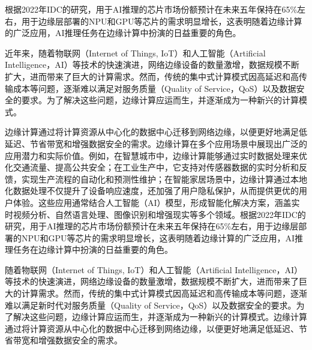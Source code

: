根据2022年IDC的研究\cite{china-ai-computing-power-2022}，用于AI推理的芯片市场份额预计在未来五年保持在65\%左右，用于边缘层部署的NPU和GPU等芯片的需求明显增长，这表明随着边缘计算的广泛应用，AI推理任务在边缘计算中扮演的日益重要的角色。

近年来，随着物联网（Internet of Things, IoT）和人工智能（Artificial Intelligence，AI）等技术的快速演进，网络边缘设备的数量激增，数据规模不断扩大，进而带来了巨大的计算需求。然而，传统的集中式计算模式因高延迟和高传输成本等问题，逐渐难以满足对服务质量（Quality of Service，QoS）以及数据安全的要求。为了解决这些问题，边缘计算应运而生，并逐渐成为一种新兴的计算模式。

边缘计算通过将计算资源从中心化的数据中心迁移到网络边缘，以便更好地满足低延迟、节省带宽和增强数据安全的需求\cite{chowdhury2019co,khan2019edge,liu2019survey,施巍松2019边缘计算,刘通2021边缘计算中任务卸载研究综述}。边缘计算在多个应用场景中展现出广泛的应用潜力和实际价值。例如，在智慧城市中，边缘计算能够通过实时数据处理来优化交通流量、提高公共安全\cite{lin2016real,jia2017edge,mohamed2017smartcityware,mallapuram2017smart,dalla2017using}；在工业生产中，它支持对传感器数据的实时分析和反馈，实现生产流程的自动化和预测性维护\cite{yin2015big,yan2017industrial,zhang2017self,peres2018idarts,mohamed2019leveraging}；在智能家居场景中，边缘计算通过本地化数据处理不仅提升了设备响应速度，还加强了用户隐私保护，从而提供更优的用户体验\cite{savio2018smart,krejcar2020technology,黄倩怡2020智能家居中的边缘计算}。这些应用通常结合人工智能（AI）模型，形成智能化解决方案，涵盖实时视频分析、自然语言处理、图像识别和增强现实等多个领域\cite{deng2020edge,gill2025edge}。根据2022年IDC的研究\cite{china-ai-computing-power-2022}，用于AI推理的芯片市场份额预计在未来五年保持在65\%左右，用于边缘层部署的NPU和GPU等芯片的需求明显增长，这表明随着边缘计算的广泛应用，AI推理任务在边缘计算中扮演的日益重要的角色。





随着物联网（Internet of Things, IoT）和人工智能（Artificial Intelligence，AI）等技术的快速演进，网络边缘设备的数量激增，数据规模不断扩大，进而带来了巨大的计算需求\cite{zwolenski2014digital}。然而，传统的集中式计算模式因高延迟和高传输成本等问题，逐渐难以满足新时代对服务质量（Quality of Service，QoS）以及数据安全的要求。为了解决这些问题，边缘计算应运而生，并逐渐成为一种新兴的计算模式。边缘计算通过将计算资源从中心化的数据中心迁移到网络边缘，以便更好地满足低延迟、节省带宽和增强数据安全的需求\cite{shi2016edge,varghese2016challenges,yu2017survey,chowdhury2019co,khan2019edge,liu2019survey,施巍松2019边缘计算,刘通2021边缘计算中任务卸载研究综述}。




